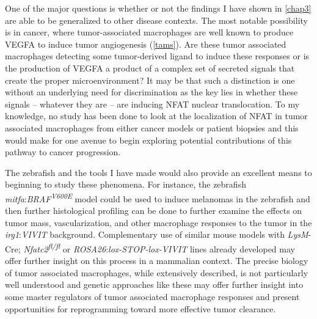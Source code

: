 One of the major questions is whether or not the findings I have shown in \autoref{chap3} are able to be generalized to other disease contexts. The most notable possibility is in cancer, where tumor-associated macrophages are well known to produce VEGFA to induce tumor angiogenesis (\autoref{tams}). Are these tumor associated macrophages detecting some tumor-derived ligand to induce these responses or is the production of VEGFA a product of a complex set of secreted signals that create the proper microenvironment? It may be that such a distinction is one without an underlying need for discrimination as the key lies in whether these signals -- whatever they are -- are inducing NFAT nuclear translocation. To my knowledge, no study has been done to look at the localization of NFAT in tumor associated macrophages from either cancer models or patient biopsies and this would make for one avenue to begin exploring potential contributions of this pathway to cancer progression. 

The zebrafish and the tools I have made would also provide an excellent means to beginning to study these phenomena. For instance, the zebrafish \textit{mitfa}:\textit{BRAF\textsuperscript{V600E}} model could be used to induce melanomas in the zebrafish and then further histological profiling can be done to further examine the effects on tumor mass, vascularization, and other macrophage responses to the tumor in the \textit{irg1}:\textit{VIVIT} background. Complementary use of similar mouse models with \textit{LysM}-Cre; \textit{Nfatc2\textsuperscript{fl/fl}} or \textit{ROSA26}:\textit{lox-STOP-lox-VIVIT} lines already developed may offer further insight on this process in a mammalian context. The precise biology of tumor associated macrophages, while extensively described, is not particularly well understood and genetic approaches like these may offer further insight into some master regulators of tumor associated macrophage responses and present opportunities for reprogramming toward more effective tumor clearance. 

